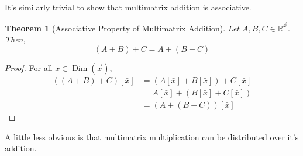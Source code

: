 \documentclass[12pt]{book}
\theoremstyle{plain}
\newtheorem{theorem}{Theorem}[chapter]
\theoremstyle{definition}
\theoremstyle{ppart}
\theoremstyle{case}
\theoremstyle{solution}
\DeclareMathOperator{\Dim}{Dim}
\begin{document}
It's similarly trivial to show that multimatrix addition is associative.

\begin{theorem}[Associative Property of Multimatrix Addition]
Let $A, B, C \in \mathbb{R}^{\vec{x}}$. Then,
\[ (A + B) + C = A + (B + C) \]
\end{theorem}
\begin{proof}
For all $\bar{x} \in \Dim(\vec{x})$,
\begin{align*}
\left( (A+B)+C \right)[\bar{x}]
&= (A[\bar{x}]+B[\bar{x}])+C[\bar{x}] \\
&= A[\bar{x}]+(B[\bar{x}]+C[\bar{x}]) \\
&= \left( A+(B+C) \right)[\bar{x}]
\end{align*}
\end{proof}

A little less obvious is that multimatrix multiplication can be
distributed over it's addition.
\end{document}
